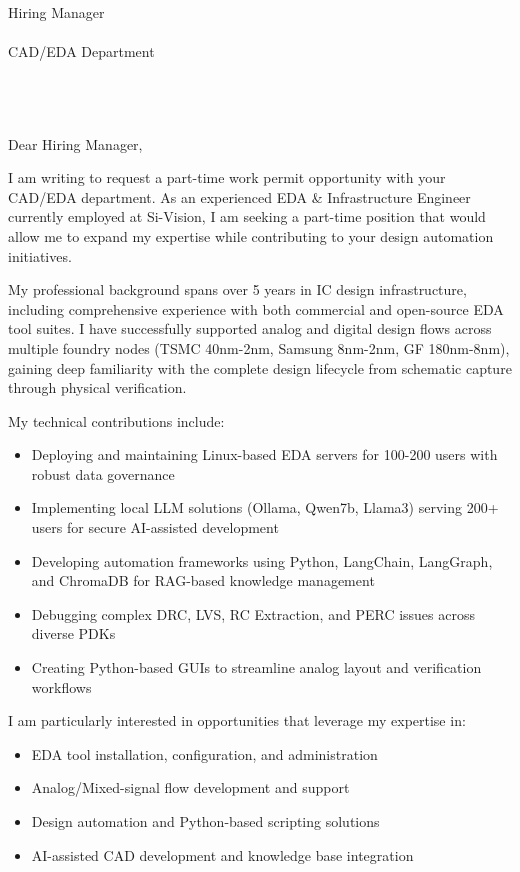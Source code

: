 \documentclass[11pt,a4paper]{letter}
\date{\today}
\begin{document}
\begin{letter}{
    Hiring Manager\\\\
    CAD/EDA Department\\\\
    [Company Name]\\\\
    [Company Address]
}

\opening{Dear Hiring Manager,}

I am writing to request a part-time work permit opportunity with your CAD/EDA department. As an experienced EDA \& Infrastructure Engineer currently employed at Si-Vision, I am seeking a part-time position that would allow me to expand my expertise while contributing to your design automation initiatives.

My professional background spans over 5 years in IC design infrastructure, including comprehensive experience with both commercial and open-source EDA tool suites. I have successfully supported analog and digital design flows across multiple foundry nodes (TSMC 40nm-2nm, Samsung 8nm-2nm, GF 180nm-8nm), gaining deep familiarity with the complete design lifecycle from schematic capture through physical verification.

My technical contributions include:
\begin{itemize}
    \item Deploying and maintaining Linux-based EDA servers for 100-200 users with robust data governance
    \item Implementing local LLM solutions (Ollama, Qwen7b, Llama3) serving 200+ users for secure AI-assisted development
    \item Developing automation frameworks using Python, LangChain, LangGraph, and ChromaDB for RAG-based knowledge management
    \item Debugging complex DRC, LVS, RC Extraction, and PERC issues across diverse PDKs
    \item Creating Python-based GUIs to streamline analog layout and verification workflows
\end{itemize}

I am particularly interested in opportunities that leverage my expertise in:
\begin{itemize}
    \item EDA tool installation, configuration, and administration
    \item Analog/Mixed-signal flow development and support
    \item Design automation and Python-based scripting solutions
    \item AI-assisted CAD development and knowledge base integration
\end{itemize}


\end{letter}
\end{document}
